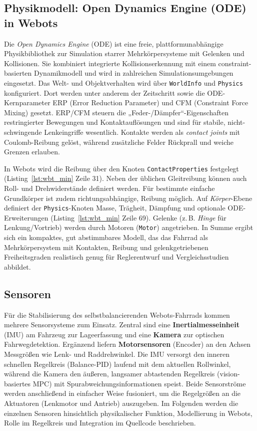  
  \subsection{Physikmodell: Open Dynamics Engine (ODE) in Webots} \label{sec:ode}
  Die \emph{Open Dynamics Engine} (ODE) ist eine freie, plattformunabhängige Physikbibliothek zur Simulation starrer Mehrkörpersysteme 
  mit Gelenken und Kollisionen. Sie kombiniert integrierte Kollisionserkennung mit einem constraint-basierten Dynamikmodell und wird 
  in zahlreichen Simulationsumgebungen eingesetzt.  Das Welt- und Objektverhalten 
  wird über \texttt{WorldInfo} und \texttt{Physics} konfiguriert. Dort werden unter anderem der Zeitschritt sowie die ODE-Kernparameter 
  ERP (Error Reduction Parameter) und CFM (Constraint Force Mixing) gesetzt. ERP/CFM steuern die „Feder-/Dämpfer“-Eigenschaften 
  restringierter Bewegungen und Kontaktauflösungen und sind für stabile, nicht-schwingende Lenkeingriffe wesentlich. Kontakte 
  werden als \emph{contact joints} mit Coulomb-Reibung gelöst, während zusätzliche Felder Rückprall und weiche Grenzen erlauben.
  
  In Webots wird die Reibung über den Knoten \texttt{ContactProperties} festgelegt (Listing~\ref{lst:wbt_min} Zeile 31). Neben der üblichen Gleitreibung 
  können auch Roll- und Drehwiderstände definiert werden. Für bestimmte einfache Grundkörper ist zudem richtungsabhängige, Reibung möglich.
  Auf \emph{Körper}-Ebene definiert der \texttt{Physics}-Knoten Masse, Trägheit, Dämpfung und optionale ODE-Erweiterungen (Listing~\ref{lst:wbt_min} Zeile 69). 
  Gelenke (z.\,B. \emph{Hinge} für Lenkung/Vortrieb) werden durch Motoren (\texttt{Motor}) angetrieben. In Summe ergibt sich ein kompaktes, gut abstimmbares Modell, das das 
  Fahrrad als Mehrkörpersystem mit Kontakten, Reibung und gelenkgetriebenen Freiheitsgraden realistisch genug für Reglerentwurf
  und Vergleichsstudien abbildet.





  \subsection{Sensoren} \label{sec:sensors}
  Für die Stabilisierung des selbstbalancierenden Webots-Fahrrads kommen mehrere Sensorsysteme zum Einsatz. Zentral sind eine \textbf{Inertialmesseinheit}
  (IMU) am Fahrzeug zur Lageerfassung und eine \textbf{Kamera} zur optischen Fahrwegdetektion. Ergänzend liefern \textbf{Motorsensoren} (Encoder) an den Achsen Messgrößen wie Lenk- und 
  Raddrehwinkel. Die IMU versorgt den inneren schnellen Regelkreis (Balance-PID) laufend mit dem aktuellen Rollwinkel, während die Kamera den äußeren, langsamer 
  abtastenden Regelkreis (vision-basiertes MPC) mit Spurabweichungsinformationen speist. Beide Sensorströme werden anschließend in einfacher Weise fusioniert, um 
  die Regelgrößen an die Aktuatoren (Lenkmotor und Antrieb) auszugeben. Im Folgenden werden die einzelnen Sensoren hinsichtlich physikalischer Funktion, 
  Modellierung in Webots, Rolle im Regelkreis und Integration im Quellcode beschrieben.
  

